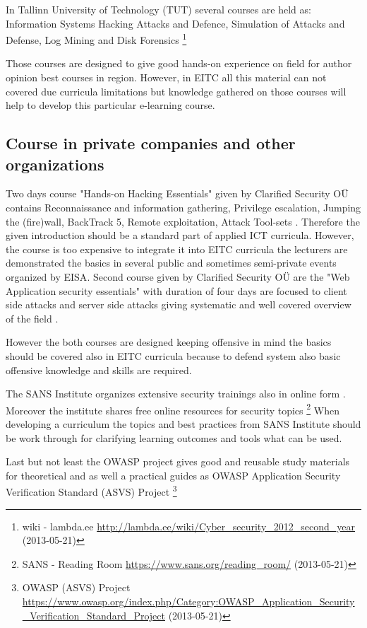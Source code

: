 In Tallinn University of Technology (\gls{TUT}) several courses are held as: Information Systems Hacking Attacks and Defence, Simulation of Attacks and Defense, Log Mining and Disk Forensics \footnote{wiki - lambda.ee \url{http://lambda.ee/wiki/Cyber_security_2012_second_year} (2013-05-21)}

Those courses are designed to give good hands-on experience on field for author opinion best courses in region. However, in \gls{EITC} all this material can not covered due curricula limitations but knowledge gathered on those courses will help to develop this particular e-learning course.

\subsection{Course in private companies and other organizations}

Two days course "Hands-on Hacking Essentials" given by Clarified Security OÜ contains Reconnaissance and information gathering, Privilege escalation, Jumping the (fire)wall, BackTrack 5, Remote exploitation, Attack Tool-sets \citep{website:clarifiedsecurity_hohe}. Therefore the given introduction should be a standard part of applied \gls{ICT} curricula. However, the course is too expensive to integrate it into \gls{EITC} curricula the lecturers are demonstrated the basics in several public and sometimes semi-private events organized by \gls{EISA}. Second course given by Clarified Security OÜ are the "Web Application security essentials" with duration of four days are focused to client side attacks and server side attacks giving systematic and well covered overview of the field \citep{website:clarifiedsecurity_hohe}.

However the both courses are designed keeping offensive in mind the basics should be covered also in \gls{EITC} curricula because to defend system also basic offensive knowledge and skills are required.

The SANS Institute organizes extensive security trainings also in online form \citep{website:SANS}. Moreover the institute shares free online resources for security topics \footnote{SANS - Reading Room \url{https://www.sans.org/reading_room/} (2013-05-21)} When developing a curriculum the topics and best practices from SANS Institute should be work through for clarifying learning outcomes and tools what can be used.

Last but not least the \gls{OWASP} project gives good and reusable study materials for theoretical and as well a practical guides as \gls{OWASP} Application Security Verification Standard (\gls{ASVS}) Project \footnote{\gls{OWASP}  (\gls{ASVS}) Project \url{https://www.owasp.org/index.php/Category:OWASP_Application_Security_Verification_Standard_Project} (2013-05-21)} 

